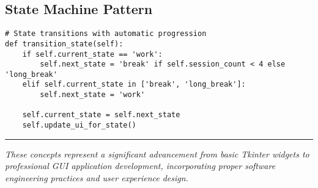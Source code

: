 \documentclass[12pt]{article}
\begin{document}
\subsection{State Machine Pattern}
\begin{lstlisting}
# State transitions with automatic progression
def transition_state(self):
    if self.current_state == 'work':
        self.next_state = 'break' if self.session_count < 4 else 'long_break'
    elif self.current_state in ['break', 'long_break']:
        self.next_state = 'work'
    
    self.current_state = self.next_state
    self.update_ui_for_state()
\end{lstlisting}

\vspace{1cm}
\hrule
\vspace{0.5cm}
\textit{These concepts represent a significant advancement from basic Tkinter widgets to professional GUI application development, incorporating proper software engineering practices and user experience design.}
\end{document}
